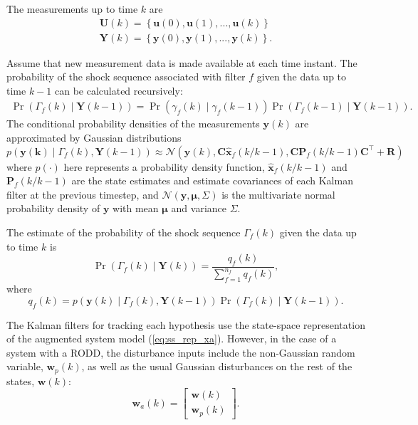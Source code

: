 The measurements up to time $k$ are
\begin{equation} \label{eq:Uk_Yk}
	\begin{aligned}
		\mathbf{U}(k)=\left\{\mathbf{u}(0), \mathbf{u}(1), ..., \mathbf{u}(k) \right\} \\
		\mathbf{Y}(k)=\left\{\mathbf{y}(0), \mathbf{y}(1), ..., \mathbf{y}(k) \right\}.
	\end{aligned}
\end{equation}

Assume that new measurement data is made available at each time instant. The probability of the shock sequence associated with filter $f$ given the data up to time $k-1$ can be calculated recursively:
\begin{multline} \label{eq:Pr_Gammakp1_given_Yk}
	\Pr(\Gamma_f(k) \mid \mathbf{Y}(k-1)) = 
	\Pr(\gamma_f(k) \mid \gamma_f(k-1)) \Pr(\Gamma_f(k-1) \mid \mathbf{Y}(k-1)).
\end{multline}
The conditional probability densities of the measurements $\mathbf{y}(k)$ are approximated by Gaussian distributions
\begin{equation} \label{eq:p_yk_given_Gammak_Ykm1}
	p(\mathbf{y(k)} \mid \Gamma_f(k), \mathbf{Y}(k-1)) \approx
	\mathcal{N}\left(\mathbf{y}(k), \mathbf{C} \mathbf{\hat{x}}_{f}(k/k-1), \mathbf{C} \mathbf{P}_f(k/k-1) \mathbf{C}^\intercal+\mathbf{R}\right)
\end{equation}
where $p(\cdot)$ here represents a probability density function, $\mathbf{\hat{x}}_{f}(k/k-1)$ and $\mathbf{P}_f(k/k-1)$ are the state estimates and estimate covariances of each Kalman filter at the previous timestep, and $\mathcal{N}(\mathbf{y}, \mathbf{\mu}, \Sigma)$ is the multivariate normal probability density of $\mathbf{y}$ with mean $\mathbf{\mu}$ and variance $\Sigma$.

The estimate of the probability of the shock sequence $\Gamma_f(k)$ given the data up to time $k$ is
\begin{equation} \label{eq:Pr_Gammak_given_Yk}
	\Pr(\Gamma_f(k) \mid \mathbf{Y}(k)) = \frac{q_f(k)}{\sum_{f=1}^{n_f} q_f(k)},
\end{equation}
where
\begin{equation} \label{eq:qfk}
	q_f(k) = p(\mathbf{y}(k) \mid \Gamma_f(k), \mathbf{Y}(k-1)) \Pr(\Gamma_f(k) \mid \mathbf{Y}(k-1)).
\end{equation}

The Kalman filters for tracking each hypothesis use the state-space representation of the augmented system model (\ref{eq:ss_rep_xa}). 
However, in the case of a system with a RODD, the disturbance inputs include the non-Gaussian random variable, $\mathbf{w}_p(k)$, as well as the usual Gaussian disturbances on the rest of the states, $\mathbf{w}(k)$:
\begin{equation} \label{eq:wak}
	\mathbf{w}_a(k) = \begin{bmatrix}
		\mathbf{w}(k) \\
		\mathbf{w}_p(k)
	\end{bmatrix}.
\end{equation}


